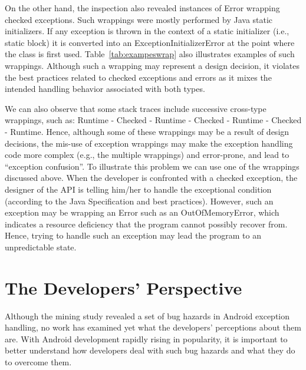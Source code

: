 On the other hand, the inspection 
also revealed instances of Error wrapping checked exceptions. Such wrappings were 
mostly performed by Java static initializers. If any exception is thrown in the context of a static initializer 
(i.e., static block)  it is converted into an ExceptionInitializerError 
at the point where the class is first used.  Table~\ref{tab:exampeswrap} also illustrates
examples of such wrappings. Although such a wrapping may represent a design decision,
it violates the best practices related to checked exceptions and errors as it mixes the intended handling 
behavior associated with both types.

We can also observe that some stack traces include successive cross-type wrappings, 
such as: Runtime - Checked - Runtime - Checked - Runtime - Checked -
Runtime. 
Hence, although some of these wrappings may be a result of design decisions, the mis-use of exception wrappings may make the exception handling 
code more complex (e.g., the multiple wrappings) and error-prone,
 and lead to ``exception confusion''. To illustrate this problem we can use one of the wrappings discussed above.
When the developer is confronted with a checked exception, the designer of the API is telling him/her 
to handle the exceptional condition (according to the Java Specification and 
best practices). However, such an exception may be wrapping an Error such
as an OutOfMemoryError, which indicates a resource deficiency 
that the program cannot possibly recover from. Hence, trying to
handle such an exception  
may lead the program to an unpredictable state.

\bigskip


\bigskip

\section{The Developers' Perspective}
\label{sec:dev}

Although the mining study revealed a set of bug hazards in Android exception handling, no work has examined yet what the developers' perceptions about them are. With Android development rapidly rising in popularity, it is important to better understand how developers deal with such bug hazards and what they do to overcome them. 

